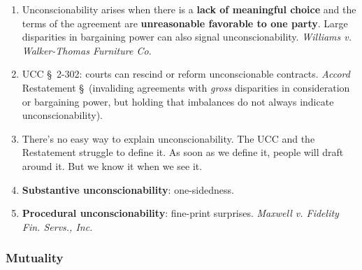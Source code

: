 \begin{enumerate}
    \item Unconscionability arises when there is a \textbf{lack of meaningful 
    choice} and the terms of the agreement are \textbf{unreasonable favorable 
    to one party}. Large disparities in bargaining power can also signal 
    unconscionability.  \emph{Williams v. Walker-Thomas Furniture Co.}
    \item UCC \S\ 2-302: courts can rescind or reform unconscionable 
    contracts. \emph{Accord} Restatement \S\ (invaliding agreements with 
    \emph{gross} disparities in consideration or bargaining power, but holding 
    that imbalances do not always indicate unconscionability).
    \item There's no easy way to explain unconscionability. The UCC and the 
    Restatement struggle to define it. As soon as we define it, people will 
    draft around it. But we know it when we see it.
    \item \textbf{Substantive unconscionability}: one-sidedness.
    \item \textbf{Procedural unconscionability}: fine-print surprises.  
    \emph{Maxwell v. Fidelity Fin. Servs., Inc.}
\end{enumerate}

\subsubsection{Mutuality}

